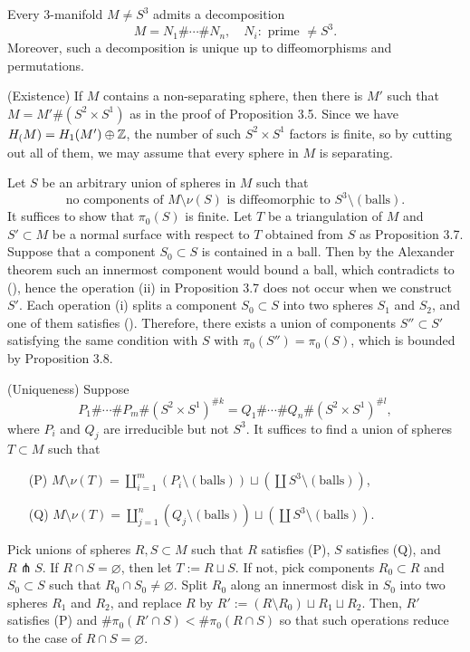 \documentclass{../../small}
\begin{document}
\begin{thm}
Every 3-manifold $M\ne S^3$ admits a decomposition
\[M=N_1\#\cdots\# N_n,\quad N_i:\text{ prime }\ne S^3.\]
Moreover, such a decomposition is unique up to diffeomorphisms and permutations.
\end{thm}
\begin{pf}
(Existence)
If $M$ contains a non-separating sphere, then there is $M'$ such that $M=M'\#(S^2\times S^1)$ as in the proof of Proposition 3.5.
Since we have $H_(M)=H_1(M')\oplus\mathbb{Z}$, the number of such $S^2\times S^1$ factors is finite, so by cutting out all of them, we may assume that every sphere in $M$ is separating.

Let $S$ be an arbitrary union of spheres in $M$ such that
\[\text{no components of $M\setminus\nu(S)$ is diffeomorphic to $S^3\setminus(\text{balls})$}.\tag{\dagger}\]
It suffices to show that $\pi_0(S)$ is finite.
Let $T$ be a triangulation of $M$ and $S'\subset M$ be a normal surface with respect to $T$ obtained from $S$ as Proposition 3.7.
Suppose that a component $S_0\subset S$ is contained in a ball.
Then by the Alexander theorem such an innermost component would bound a ball, which contradicts to (\dagger), hence the operation (ii) in Proposition 3.7 does not occur when we construct $S'$.
Each operation (i) splits a component $S_0\subset S$ into two spheres $S_1$ and $S_2$, and one of them satisfies (\dagger).
Therefore, there exists a union of components $S''\subset S'$ satisfying the same condition with $S$ with $\pi_0(S'')=\pi_0(S)$, which is bounded by Proposition 3.8.

(Uniqueness)
Suppose
\[P_1\#\cdots\#P_m\#(S^2\times S^1)^{\#k}=Q_1\#\cdots\#Q_n\#(S^2\times S^1)^{\#l},\]
where $P_i$ and $Q_j$ are irreducible but not $S^3$.
It suffices to find a union of spheres $T\subset M$ such that
\begin{enumerate}
\item[(P)]$M\setminus\nu(T)=\coprod_{i=1}^m(P_i\setminus(\text{balls}))\sqcup(\coprod S^3\setminus(\text{balls}))$,
\item[(Q)]$M\setminus\nu(T)=\coprod_{j=1}^n(Q_j\setminus(\text{balls}))\sqcup(\coprod S^3\setminus(\text{balls}))$.
\end{enumerate}
Pick unions of spheres $R,S\subset M$ such that $R$ satisfies (P), $S$ satisfies (Q), and $R\pitchfork S$.
If $R\cap S=\varnothing$, then let $T:=R\sqcup S$.
If not, pick components $R_0\subset R$ and $S_0\subset S$ such that $R_0\cap S_0\ne\varnothing$.
Split $R_0$ along an innermost disk in $S_0$ into two spheres $R_1$ and $R_2$, and replace $R$ by $R':=(R\setminus R_0)\sqcup R_1\sqcup R_2$.
Then, $R'$ satisfies (P) and $\#\pi_0(R'\cap S)<\#\pi_0(R\cap S)$ so that such operations reduce to the case of $R\cap S=\varnothing$.
\end{pf}
\end{document}
